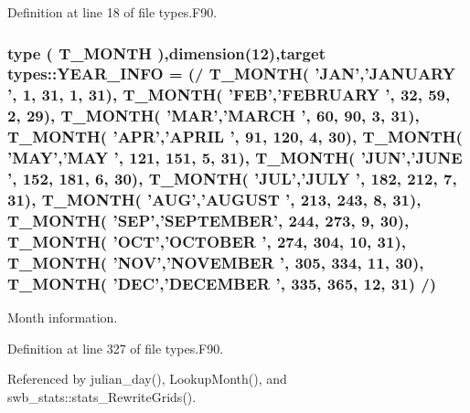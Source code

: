 Definition at line 18 of file types.F90.

\hypertarget{namespacetypes_af6a870221fe362a59d31b23393e431b1}{
\subsubsection[{YEAR\_\-INFO}]{\setlength{\rightskip}{0pt plus 5cm}type ( {\bf T\_\-MONTH} ),dimension(12),target {\bf types::YEAR\_\-INFO} = (/ {\bf T\_\-MONTH}( 'JAN','JANUARY ', 1, 31, 1, 31), {\bf T\_\-MONTH}( 'FEB','FEBRUARY ', 32, 59, 2, 29), {\bf T\_\-MONTH}( 'MAR','MARCH ', 60, 90, 3, 31), {\bf T\_\-MONTH}( 'APR','APRIL ', 91, 120, 4, 30), {\bf T\_\-MONTH}( 'MAY','MAY ', 121, 151, 5, 31), {\bf T\_\-MONTH}( 'JUN','JUNE ', 152, 181, 6, 30), {\bf T\_\-MONTH}( 'JUL','JULY ', 182, 212, 7, 31), {\bf T\_\-MONTH}( 'AUG','AUGUST ', 213, 243, 8, 31), {\bf T\_\-MONTH}( 'SEP','SEPTEMBER', 244, 273, 9, 30), {\bf T\_\-MONTH}( 'OCT','OCTOBER ', 274, 304, 10, 31), {\bf T\_\-MONTH}( 'NOV','NOVEMBER ', 305, 334, 11, 30), {\bf T\_\-MONTH}( 'DEC','DECEMBER ', 335, 365, 12, 31) /)}}
\label{namespacetypes_af6a870221fe362a59d31b23393e431b1}


Month information. 



Definition at line 327 of file types.F90.



Referenced by julian\_\-day(), LookupMonth(), and swb\_\-stats::stats\_\-RewriteGrids().

